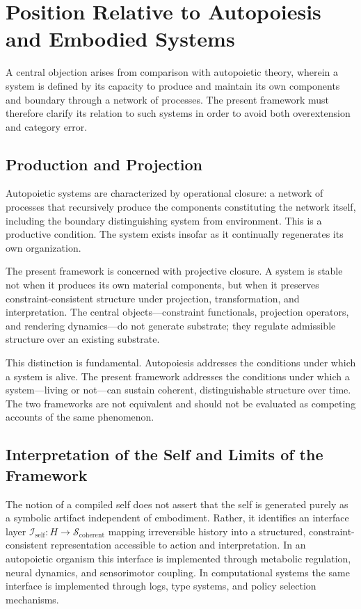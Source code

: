 \documentclass[12pt, a4paper]{article}
\theoremstyle{plain}
\theoremstyle{definition}
\theoremstyle{remark}
\begin{document}
\section{Position Relative to Autopoiesis and Embodied Systems}

A central objection arises from comparison with autopoietic theory, wherein a system is defined by its capacity to produce and maintain its own components and boundary through a network of processes. The present framework must therefore clarify its relation to such systems in order to avoid both overextension and category error.

\subsection{Production and Projection}

Autopoietic systems are characterized by operational closure: a network of processes that recursively produce the components constituting the network itself, including the boundary distinguishing system from environment. This is a productive condition. The system exists insofar as it continually regenerates its own organization.

The present framework is concerned with projective closure. A system is stable not when it produces its own material components, but when it preserves constraint-consistent structure under projection, transformation, and interpretation. The central objects---constraint functionals, projection operators, and rendering dynamics---do not generate substrate; they regulate admissible structure over an existing substrate.

This distinction is fundamental. Autopoiesis addresses the conditions under which a system is alive. The present framework addresses the conditions under which a system---living or not---can sustain coherent, distinguishable structure over time. The two frameworks are not equivalent and should not be evaluated as competing accounts of the same phenomenon.

\subsection{Interpretation of the Self and Limits of the Framework}

The notion of a compiled self does not assert that the self is generated purely as a symbolic artifact independent of embodiment. Rather, it identifies an interface layer $\mathcal{I}_{\mathrm{self}} : H \to \mathcal{S}_{\mathrm{coherent}}$ mapping irreversible history into a structured, constraint-consistent representation accessible to action and interpretation. In an autopoietic organism this interface is implemented through metabolic regulation, neural dynamics, and sensorimotor coupling. In computational systems the same interface is implemented through logs, type systems, and policy selection mechanisms.
\end{document}
